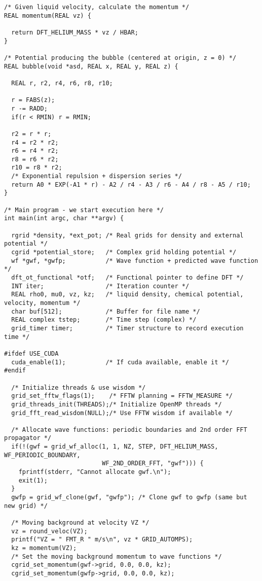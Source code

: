 \documentclass[12pt,letterpaper]{report}
\begin{document}
\begin{verbatim}
/* Given liquid velocity, calculate the momentum */
REAL momentum(REAL vz) {

  return DFT_HELIUM_MASS * vz / HBAR;
}

/* Potential producing the bubble (centered at origin, z = 0) */
REAL bubble(void *asd, REAL x, REAL y, REAL z) {

  REAL r, r2, r4, r6, r8, r10;

  r = FABS(z);
  r -= RADD;
  if(r < RMIN) r = RMIN;

  r2 = r * r;
  r4 = r2 * r2;
  r6 = r4 * r2;
  r8 = r6 * r2;
  r10 = r8 * r2;
  /* Exponential repulsion + dispersion series */
  return A0 * EXP(-A1 * r) - A2 / r4 - A3 / r6 - A4 / r8 - A5 / r10;
}

/* Main program - we start execution here */
int main(int argc, char **argv) {

  rgrid *density, *ext_pot; /* Real grids for density and external potential */
  cgrid *potential_store;   /* Complex grid holding potential */
  wf *gwf, *gwfp;           /* Wave function + predicted wave function */
  dft_ot_functional *otf;   /* Functional pointer to define DFT */
  INT iter;                 /* Iteration counter */
  REAL rho0, mu0, vz, kz;   /* liquid density, chemical potential, velocity, momentum */
  char buf[512];            /* Buffer for file name */
  REAL complex tstep;       /* Time step (complex) */
  grid_timer timer;         /* Timer structure to record execution time */

#ifdef USE_CUDA
  cuda_enable(1);           /* If cuda available, enable it */
#endif

  /* Initialize threads & use wisdom */
  grid_set_fftw_flags(1);    /* FFTW planning = FFTW_MEASURE */
  grid_threads_init(THREADS);/* Initialize OpenMP threads */
  grid_fft_read_wisdom(NULL);/* Use FFTW wisdom if available */

  /* Allocate wave functions: periodic boundaries and 2nd order FFT propagator */
  if(!(gwf = grid_wf_alloc(1, 1, NZ, STEP, DFT_HELIUM_MASS, WF_PERIODIC_BOUNDARY,
                           WF_2ND_ORDER_FFT, "gwf"))) {
    fprintf(stderr, "Cannot allocate gwf.\n");
    exit(1);
  }
  gwfp = grid_wf_clone(gwf, "gwfp"); /* Clone gwf to gwfp (same but new grid) */

  /* Moving background at velocity VZ */
  vz = round_veloc(VZ);
  printf("VZ = " FMT_R " m/s\n", vz * GRID_AUTOMPS);
  kz = momentum(VZ);
  /* Set the moving background momentum to wave functions */
  cgrid_set_momentum(gwf->grid, 0.0, 0.0, kz);
  cgrid_set_momentum(gwfp->grid, 0.0, 0.0, kz);


\end{verbatim}
\end{document}
